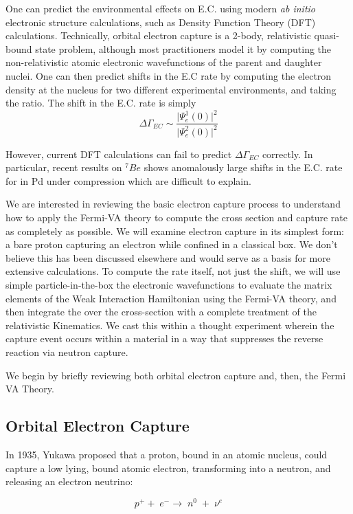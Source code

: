 \documentclass[%
 aip,
 jmp,%
 amsmath,amssymb,
 reprint,%
]{revtex4-1}
\begin{document}
One can predict the environmental effects on E.C. using modern \emph{ab initio} electronic structure calculations, such as Density Function Theory (DFT) calculations.\cite{PhysRevC.71.025801}   Technically, orbital electron capture is a 2-body, relativistic quasi-bound state problem, although most practitioners model it by computing the non-relativistic atomic electronic wavefunctions of the parent and daughter nuclei. One can then predict  shifts in the E.C rate by  computing the electron density at the nucleus for two different experimental environments, and taking the ratio.  The shift in the E.C. rate is simply 
$$\Delta\Gamma_{EC}\sim\dfrac{\big\vert\Psi^{1}_{e}(0)\big\vert^{2}} {\big\vert\Psi^{2}_{e}(0)\big\vert^{2}} $$

However, current DFT calculations can fail to predict $\Delta\Gamma_{EC}$ correctly.    In particular, recent results on $^{7}Be$ shows anomalously large shifts in the E.C. rate for in Pd under compression which are difficult to explain.\cite{PhysRevC.101.035801}

We are interested in reviewing the basic  electron capture process to  understand how to apply the Fermi-VA theory to compute the cross section and capture rate as completely as possible.  We will examine electron capture in its simplest form:  a bare proton capturing an electron while confined in a classical box.   We don't believe this has been discussed elsewhere and would serve as a basis for more extensive calculations.    To compute the rate itself, not just the shift,  we will use simple particle-in-the-box the electronic wavefunctions to evaluate the matrix elements of the Weak Interaction Hamiltonian using the Fermi-VA theory, and then integrate the over the cross-section with a complete treatment of the relativistic Kinematics.  We cast this within a thought experiment wherein the capture event occurs within a material in a way that suppresses the reverse reaction via neutron capture.

We begin by briefly reviewing both orbital electron capture and, then, the Fermi VA Theory.

\subsection{Orbital Electron Capture}
In 1935, Yukawa proposed that a proton, bound in an atomic nucleus,  could capture a low lying, bound atomic electron, transforming into a neutron, and releasing an electron neutrino:


$$p^{+}+\;e^{-}\rightarrow\;n^{0}\;+\;\nu^{e}$$
\end{document}
